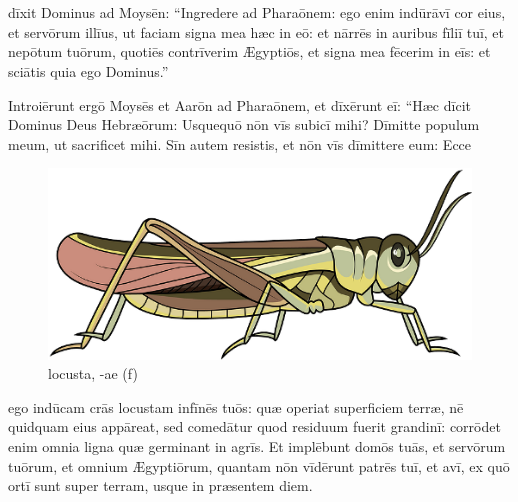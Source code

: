 \chapter{}


\thispagestyle{empty}

 dīxit Dominus ad Moysēn: ``Ingredere ad Pharaōnem: ego enim indūrāvī cor eius, et servōrum illīus, ut faciam signa mea hæc in eō:
et nārrēs in auribus fīliī tuī, et nepōtum tuōrum,
quotiēs contrīverim Ægyptiōs, et signa mea fēcerim in eīs:
et sciātis quia ego Dominus.''

Introiērunt ergō
Moysēs et Aarōn ad Pharaōnem, et dīxērunt eī: ``Hæc dīcit
Dominus Deus Hebræōrum: Usquequō nōn vīs
subicī mihi? Dīmitte populum meum, ut
sacrificet mihi.  Sīn autem resistis, et nōn vīs dīmittere eum: Ecce
\begin{figure}[ht]
    \centering
    \includegraphics{locusta}
    \caption{locusta, -ae (f)}
\end{figure}%
ego indūcam crās locustam in\linebreak fīnēs tuōs:  quæ operiat
superficiem terræ, nē quidquam eius appāreat, sed
comedātur quod residuum
fuerit grandinī: corrōdet enim omnia ligna quæ
germinant in agrīs.  Et implēbunt domōs tuās, et servōrum
tuōrum, et omnium Ægyptiōrum, quantam nōn vīdērunt patrēs tuī, et avī, ex
quō ortī sunt super terram, usque in præsentem diem. 


